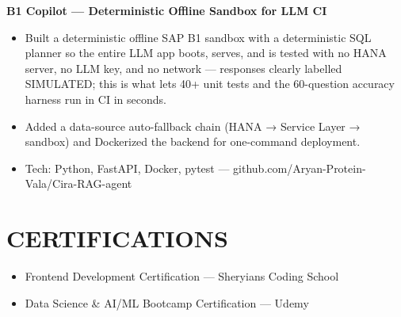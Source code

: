 \documentclass[9pt]{article}
\begin{document}
\textbf{B1 Copilot  ---  Deterministic Offline Sandbox for LLM CI}
\vspace{1pt}
\begin{itemize}[leftmargin=11pt,itemsep=0pt,topsep=1pt,parsep=0pt]
\item Built a deterministic offline SAP B1 sandbox with a deterministic SQL planner so the entire LLM app boots, serves, and is tested with no HANA server, no LLM key, and no network  ---  responses clearly labelled SIMULATED; this is what lets 40+ unit tests and the 60-question accuracy harness run in CI in seconds.
\item Added a data-source auto-fallback chain (HANA → Service Layer → sandbox) and Dockerized the backend for one-command deployment.
\item Tech: Python, FastAPI, Docker, pytest  ---  github.com/Aryan-Protein-Vala/Cira-RAG-agent
\end{itemize}
\section*{CERTIFICATIONS}
\begin{itemize}[leftmargin=11pt,itemsep=0pt,topsep=1pt,parsep=0pt]
\item Frontend Development Certification  ---  Sheryians Coding School
\item Data Science \& AI/ML Bootcamp Certification  ---  Udemy
\end{itemize}
\end{document}
